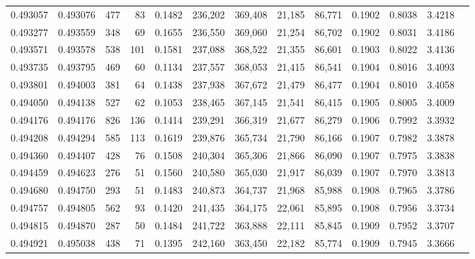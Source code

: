\begin{tabular}{rrrrrrrrrrrrr}
0.493057 & 0.493076 &   477 &    83 &                                     0.1482 & 236,202 & 369,408 &  21,185 &  86,771 & 0.1902 & 0.8038 & 3.4218 \\
0.493277 & 0.493559 &   348 &    69 &                                     0.1655 & 236,550 & 369,060 &  21,254 &  86,702 & 0.1902 & 0.8031 & 3.4186 \\
0.493571 & 0.493578 &   538 &   101 &                                     0.1581 & 237,088 & 368,522 &  21,355 &  86,601 & 0.1903 & 0.8022 & 3.4136 \\
0.493735 & 0.493795 &   469 &    60 &                                     0.1134 & 237,557 & 368,053 &  21,415 &  86,541 & 0.1904 & 0.8016 & 3.4093 \\
0.493801 & 0.494003 &   381 &    64 &                                     0.1438 & 237,938 & 367,672 &  21,479 &  86,477 & 0.1904 & 0.8010 & 3.4058 \\
0.494050 & 0.494138 &   527 &    62 &                                     0.1053 & 238,465 & 367,145 &  21,541 &  86,415 & 0.1905 & 0.8005 & 3.4009 \\
0.494176 & 0.494176 &   826 &   136 &                                     0.1414 & 239,291 & 366,319 &  21,677 &  86,279 & 0.1906 & 0.7992 & 3.3932 \\
0.494208 & 0.494294 &   585 &   113 &                                     0.1619 & 239,876 & 365,734 &  21,790 &  86,166 & 0.1907 & 0.7982 & 3.3878 \\
0.494360 & 0.494407 &   428 &    76 &                                     0.1508 & 240,304 & 365,306 &  21,866 &  86,090 & 0.1907 & 0.7975 & 3.3838 \\
0.494459 & 0.494623 &   276 &    51 &                                     0.1560 & 240,580 & 365,030 &  21,917 &  86,039 & 0.1907 & 0.7970 & 3.3813 \\
0.494680 & 0.494750 &   293 &    51 &                                     0.1483 & 240,873 & 364,737 &  21,968 &  85,988 & 0.1908 & 0.7965 & 3.3786 \\
0.494757 & 0.494805 &   562 &    93 &                                     0.1420 & 241,435 & 364,175 &  22,061 &  85,895 & 0.1908 & 0.7956 & 3.3734 \\
0.494815 & 0.494870 &   287 &    50 &                                     0.1484 & 241,722 & 363,888 &  22,111 &  85,845 & 0.1909 & 0.7952 & 3.3707 \\
0.494921 & 0.495038 &   438 &    71 &                                     0.1395 & 242,160 & 363,450 &  22,182 &  85,774 & 0.1909 & 0.7945 & 3.3666 \\

\end{tabular}
